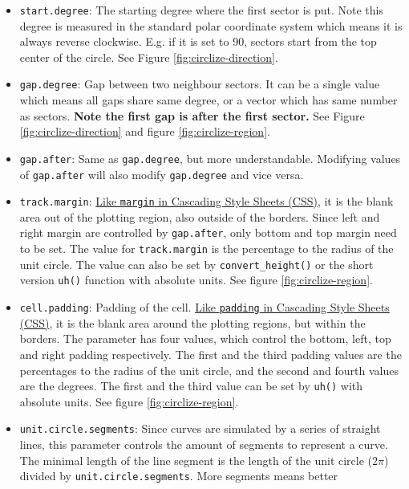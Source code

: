 \documentclass[]{book}
\providecommand{\tightlist}{%
  \setlength{\itemsep}{0pt}\setlength{\parskip}{0pt}}
\begin{document}
\begin{itemize}
\tightlist
\item
  \texttt{start.degree}: The starting degree where the first sector is
  put. Note this degree is measured in the standard polar coordinate
  system which means it is always reverse clockwise. E.g. if it is set
  to 90, sectors start from the top center of the circle. See Figure
  \ref{fig:circlize-direction}.
\item
  \texttt{gap.degree}: Gap between two neighbour sectors. It can be a
  single value which means all gaps share same degree, or a vector which
  has same number as sectors. \textbf{Note the first gap is after the
  first sector.} See Figure \ref{fig:circlize-direction} and figure
  \ref{fig:circlize-region}.
\item
  \texttt{gap.after}: Same as \texttt{gap.degree}, but more
  understandable. Modifying values of \texttt{gap.after} will also
  modify \texttt{gap.degree} and vice versa.
\item
  \texttt{track.margin}:
  \href{https://www.w3schools.com/css/css_margin.asp}{Like
  \texttt{margin} in Cascading Style Sheets (CSS)}, it is the blank area
  out of the plotting region, also outside of the borders. Since left
  and right margin are controlled by \texttt{gap.after}, only bottom and
  top margin need to be set. The value for \texttt{track.margin} is the
  percentage to the radius of the unit circle. The value can also be set
  by \texttt{convert\_height()} or the short version \texttt{uh()}
  function with absolute units. See figure \ref{fig:circlize-region}.
\item
  \texttt{cell.padding}: Padding of the cell.
  \href{https://www.w3schools.com/css/css_padding.asp}{Like
  \texttt{padding} in Cascading Style Sheets (CSS)}, it is the blank
  area around the plotting regions, but within the borders. The
  parameter has four values, which control the bottom, left, top and
  right padding respectively. The first and the third padding values are
  the percentages to the radius of the unit circle, and the second and
  fourth values are the degrees. The first and the third value can be
  set by \texttt{uh()} with absolute units. See figure
  \ref{fig:circlize-region}.
\item
  \texttt{unit.circle.segments}: Since curves are simulated by a series
  of straight lines, this parameter controls the amount of segments to
  represent a curve. The minimal length of the line segment is the
  length of the unit circle (\(2\pi\)) divided by
  \texttt{unit.circle.segments}. More segments means better

\end{itemize}
\end{document}
